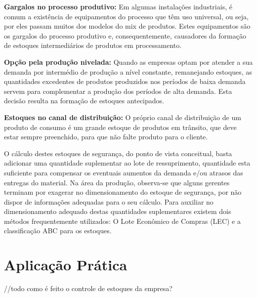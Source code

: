 \textbf{Gargalos no processo produtivo:} Em algumas instalações industriais, é comum a existência de equipamentos do processo que têm uso universal, ou seja, por eles passam muitos dos modelos do mix de produtos. Estes equipamentos são os gargalos do processo produtivo e, consequentemente, causadores da formação de estoques intermediários de produtos em processamento. 

\textbf{Opção pela produção nivelada:} Quando as empresas optam por atender a sua demanda por intermédio de produção a nível constante, remanejando estoques, as quantidades excedentes de produtos produzidos nos períodos de baixa demanda servem para complementar a produção dos períodos de alta demanda. Esta decisão resulta na formação de estoques antecipados.

\textbf{Estoques no canal de distribuição:} O próprio canal de distribuição de um produto de consumo é um grande estoque de produtos em trânsito, que deve estar sempre preenchido, para que não falte produto para o cliente.


O cálculo destes estoques de segurança, do ponto de vista conceitual, basta adicionar uma quantidade suplementar ao lote de ressuprimento, quantidade esta suficiente para compensar os eventuais aumentos da demanda e/ou atrasos das entregas do material. Na área da produção, observa-se que alguns gerentes terminam por exagerar no dimensionamento do estoque de segurança, por não dispor de informações adequadas para o seu cálculo. Para auxiliar no dimensionamento adequado destas quantidades suplementares existem dois métodos frequentemente utilizados: O Lote Econômico de Compras (LEC) e a classificação ABC para os estoques.

\section{Aplicação Prática}
\label{sec:controle_estoques_aplicacao}

//todo como é feito o controle de estoques da empresa?